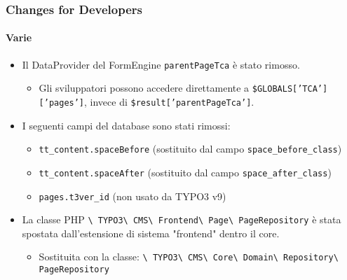 \begin{frame}[fragile]
	\frametitle{Changes for Developers}
	\framesubtitle{Varie}

	\begin{itemize}
		\item Il DataProvider del FormEngine \texttt{parentPageTca} è stato rimosso.

			\begin{itemize}\smaller
				\item[\ding{228}] Gli sviluppatori possono accedere direttamente a \texttt{\$GLOBALS['TCA']['pages']}, invece di \texttt{\$result['parentPageTca']}.
			\end{itemize}\normalsize

		\item I seguenti campi del database sono stati rimossi:

			\begin{itemize}\smaller
				\item \texttt{tt\_content.spaceBefore} (sostituito dal campo \texttt{space\_before\_class})
				\item \texttt{tt\_content.spaceAfter} (sostituito dal campo \texttt{space\_after\_class})
				\item \texttt{pages.t3ver\_id} (non usato da TYPO3 v9)
			\end{itemize}\normalsize

		\item La classe PHP
			\texttt{\textbackslash
				TYPO3\textbackslash
				CMS\textbackslash
				Frontend\textbackslash
				Page\textbackslash
				PageRepository} è stata spostata dall'estensione di sistema "frontend" dentro il core.

			\begin{itemize}\smaller
				\item Sostituita con la classe:
					\texttt{\textbackslash
						TYPO3\textbackslash
						CMS\textbackslash
						Core\textbackslash
						Domain\textbackslash
						Repository\textbackslash
						PageRepository}
			\end{itemize}\normalsize

	\end{itemize}

\end{frame}


